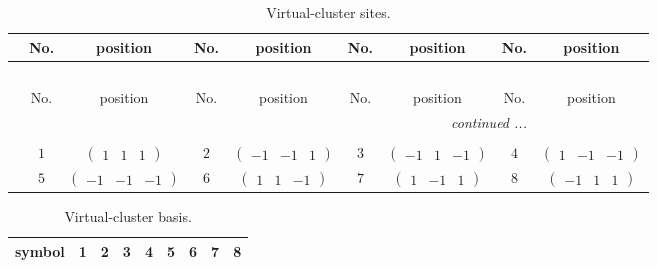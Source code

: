 \documentclass[fleqn,10pt,landscape]{article}
\begin{document}
\begin{itemize}
{
\scriptsize
\begin{center}
\renewcommand{\arraystretch}{1.7}
\begin{longtable}{ccccccccc}
\caption{Virtual-cluster sites.}
 \\
 \hline \hline
 & No. & position & No. & position & No. & position & No. & position \\ \hline \endfirsthead

\multicolumn{8}{l}{\tablename\ \thetable{}} \\
 \hline \hline
 & No. & position & No. & position & No. & position & No. & position \\ \hline \endhead

 \hline \hline
\multicolumn{8}{r}{\footnotesize\it continued ...} \\ \endfoot

 \hline \hline
\multicolumn{8}{r}{} \\ \endlastfoot

 & $ 1 $ & $ \begin{pmatrix} 1 & 1 & 1 \end{pmatrix} $ & $ 2 $ & $ \begin{pmatrix} -1 & -1 & 1 \end{pmatrix} $ & $ 3 $ & $ \begin{pmatrix} -1 & 1 & -1 \end{pmatrix} $ & $ 4 $ & $ \begin{pmatrix} 1 & -1 & -1 \end{pmatrix} $ \\
& $ 5 $ & $ \begin{pmatrix} -1 & -1 & -1 \end{pmatrix} $ & $ 6 $ & $ \begin{pmatrix} 1 & 1 & -1 \end{pmatrix} $ & $ 7 $ & $ \begin{pmatrix} 1 & -1 & 1 \end{pmatrix} $ & $ 8 $ & $ \begin{pmatrix} -1 & 1 & 1 \end{pmatrix} $ \\
\end{longtable}
\end{center}
\begin{center}
\renewcommand{\arraystretch}{1.7}
\begin{longtable}{ccccccccc}
\caption{Virtual-cluster basis.}
 \\
 \hline \hline
symbol & 1 & 2 & 3 & 4 & 5 & 6 & 7 & 8 \\ \hline \endfirsthead


\end{longtable}
\end{center}}
\end{itemize}
\end{document}
